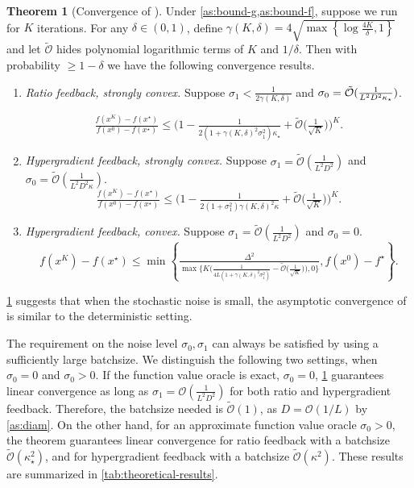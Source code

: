 \documentclass{article}
\theoremstyle{definition}
\newtheorem{theorem}{Theorem}[section]
\DeclareRobustCommand{\namerefc}[2]{\hyperref[#2]{\textcolor{#1}{\nameref*{#2}}}}
\newcommand{\osgd}{\namerefc{purple}{alg:sosgm}}
\begin{document}
\begin{theorem}[Convergence of {\osgd}]
  \label{thm:conv-subG}
  Under \cref{as:bound-g,as:bound-f}, suppose we run {\osgd} for $K$
  iterations. 
  For any $\delta \in (0, 1)$, define $\gamma
  (K, \delta) = 4 \sqrt{\max \left\{ \log \tfrac{4 K}{\delta}, 1 \right\}}$ and 
  let $\tilde{\mathcal{O}}$ hides polynomial logarithmic terms of $K$ and $1/{\delta}$. 
  Then with probability $\geq 1 - \delta$ we have the following convergence results.
  \begin{enumerate}
    \item {\emph{Ratio feedback, strongly convex.}} Suppose $\sigma_1 < \tfrac{1}{2 \gamma (K, \delta)}$ and $\sigma_0 =\tilde{\mathcal{O}}\large( \tfrac{1}{L^2 D^2 \kappa_{\star}} \large)$.
    
    \[ \tfrac{f (x^{K}) - f (x^{\star})}{f (x^0) - f (x^{\star})} \leq
       \big( 1 - \tfrac{1}{2 \left( 1 + \gamma
       (K, \delta)^2 \sigma_1^2  \right) \kappa_{\star}} +
       \tilde{\mathcal{O}} \big( \tfrac{1}{\sqrt{K}} \big) \big)^K . \]
    \item {\emph{Hypergradient feedback, strongly convex.}} Suppose $\sigma_1 =\tilde{\mathcal{O}} \left( \tfrac{1}{L^2 D^2} \right)$ and
    $\sigma_0 =\tilde{\mathcal{O}} \left( \tfrac{1}{L^2 D^2 \kappa} \right)$.
    \[ \tfrac{f (x^{K}) - f (x^{\star})}{f (x^0) - f (x^{\star})} \leq
       \big( 1 - \tfrac{1}{2 (1 + \sigma_1^2 ) \gamma (K, \delta)^2 \kappa} +
       \tilde{\mathcal{O}} \big( \tfrac{1}{\sqrt{K}} \big) \big)^K . \]
    \item {\emph{Hypergradient feedback, convex.}} Suppose $\sigma_1 =\tilde{\mathcal{O}} \left( \tfrac{1}{L^2 D^2} \right)$ and $\sigma_0 = 0$.
    \[ f (x^{K}) - f (x^{\star}) \leq \min \left\{ \tfrac{\Delta^2}{\max
       \big\{ K \big( \frac{1}{4 L (1 + \gamma (K, \delta)^2 \sigma_1^2)} -
       \tilde{\mathcal{O}} \big( \tfrac{1}{\sqrt{K}} \big) \big), 0 \big\}}, f (x^0) - f^{\star}
       \right\} . \]
  \end{enumerate}
\end{theorem}

\cref{thm:conv-subG} suggests that when the stochastic noise is small, the asymptotic convergence of {\osgd} is similar to the deterministic setting. 

The requirement on the noise level $\sigma_0, \sigma_1$ can always be satisfied by using a sufficiently large batchsize. We distinguish the following two settings, when $\sigma_0=0$ and $\sigma_0>0$. 
If the function value oracle is exact, $\sigma_0=0$, 
\cref{thm:conv-subG} guarantees linear convergence as long as $\sigma_1 = \mathcal{O}(\tfrac{1}{L^2 D^2})$ for both ratio and hypergradient feedback. 
Therefore, the batchsize needed is $\tilde{\mathcal{O}}(1)$, as $D = \mathcal{O}(1/L)$ by \cref{as:diam}. 
On the other hand, for an approximate function value oracle $\sigma_0>0$,
the theorem guarantees linear convergence for 
ratio feedback with a batchsize $\tilde{\mathcal{O}}(\kappa_\star^2)$, and for hypergradient feedback with a batchsize $\tilde{\mathcal{O}}(\kappa^2)$. These results are summarized in \cref{tab:theoretical-results}.
\end{document}
